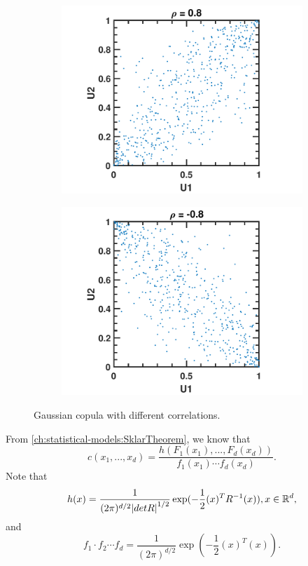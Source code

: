 \begin{refsection}
\begin{figure}[H]
\begin{subfigure}[b]{0.42\textwidth}
		\includegraphics[width=\textwidth]{figures/statisticalModeling/GaussianCopulaDemo3}
		
	\end{subfigure}
		\begin{subfigure}[b]{0.42\textwidth}
		\includegraphics[width=\textwidth]{figures/statisticalModeling/GaussianCopulaDemo4}
		
	\end{subfigure}
	\caption{Gaussian copula with different correlations.}

\end{figure}


\begin{remark}
From \autoref{ch:statistical-models:SklarTheorem}, we know that	
$$c(x_1,...,x_d) = \frac{h(F_1(x_1),...,F_d(x_d))}{f_1(x_1)\cdots f_d(x_d)}.$$
Note that
$$h(x)= \frac{1}{(2\pi)^{d/2}\abs{det  R}^{1/2}}\exp(-\frac{1}{2}(x)^T R^{-1}(x)),x\in \mathbb{R}^d, $$
and
$$f_1\cdot f_2\cdots f_d= \frac{1}{(2\pi)^{d/2}}\exp(-\frac{1}{2}(x)^T (x)). $$
\end{remark}



\end{refsection}
